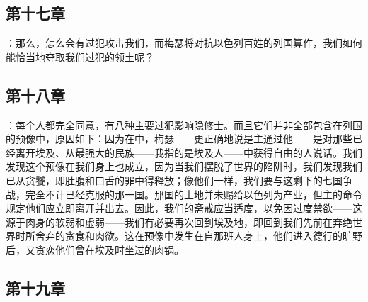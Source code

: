 
\subsection{第十七章}

\par

：那么，怎么会有过犯攻击我们，而梅瑟将对抗以色列百姓的列国算作，我们如何能恰当地夺取我们过犯的领土呢？\par


\subsection{第十八章}

：每个人都完全同意，有八种主要过犯影响隐修士。而且它们并非全部包含在列国的预像中，原因如下：因为在中，梅瑟——更正确地说是主通过他——是对那些已经离开埃及、从最强大的民族——我指的是埃及人——中获得自由的人说话。我们发现这个预像在我们身上也成立，因为当我们摆脱了世界的陷阱时，我们发现我们已从贪饕，即肚腹和口舌的罪中得释放；像他们一样，我们要与这剩下的七国争战，完全不计已经克服的那一国。那国的土地并未赐给以色列为产业，但主的命令规定他们应立即离开并出去。因此，我们的斋戒应当适度，以免因过度禁欲——这源于肉身的软弱和虚弱——我们有必要再次回到埃及地，即回到我们先前在弃绝世界时所舍弃的贪食和肉欲。这在预像中发生在自那班人身上，他们进入德行的旷野后，又贪恋他们曾在埃及时坐过的肉锅。\par


\subsection{第十九章}

\par

